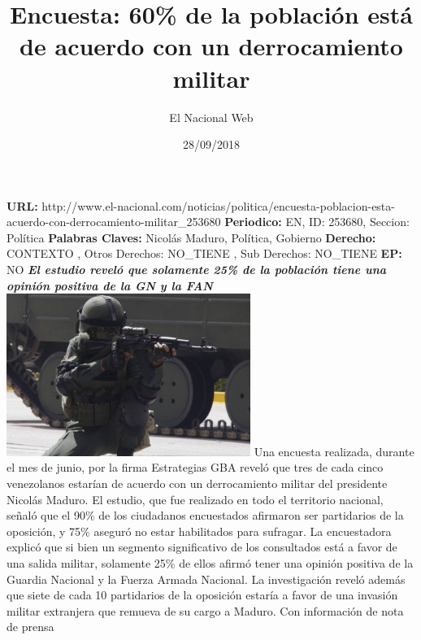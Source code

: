 \documentclass{article}%
\title{\textbf{Encuesta: 60\% de la población está de acuerdo con un derrocamiento militar}}%
\author{El Nacional Web}%
\date{28/09/2018}%
\begin{document}
%
\normalsize%
\maketitle%
\textbf{URL: }%
http://www.el{-}nacional.com/noticias/politica/encuesta{-}poblacion{-}esta{-}acuerdo{-}con{-}derrocamiento{-}militar\_253680\newline%
%
\textbf{Periodico: }%
EN, %
ID: %
253680, %
Seccion: %
Política\newline%
%
\textbf{Palabras Claves: }%
Nicolás Maduro, Política, Gobierno\newline%
%
\textbf{Derecho: }%
CONTEXTO%
, Otros Derechos: %
NO\_TIENE%
, Sub Derechos: %
NO\_TIENE%
\newline%
%
\textbf{EP: }%
NO\newline%
\newline%
%
\textbf{\textit{El estudio reveló que solamente 25\% de la población tiene una opinión positiva de la GN y la FAN}}%
\newline%
\newline%
%
\includegraphics[width=300px]{132.jpg}%
\newline%
%
Una encuesta realizada, durante el mes de junio, por la firma Estrategias GBA reveló que tres de cada cinco venezolanos estarían de acuerdo con un derrocamiento militar del presidente Nicolás Maduro.%
\newline%
%
El estudio, que fue realizado en todo el territorio nacional, señaló que el 90\% de los ciudadanos encuestados afirmaron ser partidarios de la oposición, y 75\% aseguró no estar habilitados para sufragar.%
\newline%
%
La encuestadora explicó que si bien un segmento significativo de los consultados está a favor de una salida militar, solamente 25\% de ellos afirmó tener una opinión positiva de la Guardia Nacional y la Fuerza Armada Nacional.%
\newline%
%
La investigación reveló además que siete de cada 10 partidarios de la oposición estaría a favor de una invasión militar extranjera que remueva de su cargo a Maduro.%
\newline%
%
Con información de nota de prensa%
\newline%
%
\end{document}
